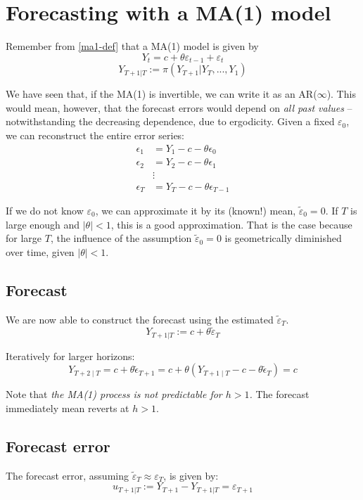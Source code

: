 \documentclass[11pt, a4paper]{report}
\theoremstyle{plain}
\theoremstyle{plain}
\theoremstyle{remark}
\begin{document}
\section{Forecasting with a MA(1) model}

Remember from \ref{ma1-def} that a MA(1) model is given by
$$ Y_t = c + \theta \varepsilon_{t-1} + \varepsilon_{t} $$
$$ Y_{T+1|T} := \pi(Y_{T+1} | Y_T,..., Y_1) $$

We have seen that, if the MA(1) is invertible, we can write it as an AR($\infty$). This would mean, however, that the forecast errors would depend on \textit{all past values} -- notwithstanding the decreasing dependence, due to ergodicity. Given a fixed $\varepsilon_{0}$, we can reconstruct the entire error series: 
$$\begin{aligned}
	\epsilon_{1} &=Y_{1}-c-\theta \epsilon_{0} \\
	\epsilon_{2} &=Y_{2}-c-\theta \epsilon_{1} \\
	& \vdots \\
	\epsilon_{T} &=Y_{T}-c-\theta \epsilon_{T-1}
\end{aligned}$$

If we do not know $\varepsilon_{0}$, we can approximate it by its (known!) mean, $\tilde{\varepsilon}_0 = 0$. If $T$ is large enough and $|\theta| < 1$, this is a good approximation. That is the case because for large $T$, the influence of the assumption $\tilde{\varepsilon}_0 = 0$ is geometrically diminished over time, given $|\theta| < 1$. 


\subsection{Forecast}

We are now able to construct the forecast using the estimated $\tilde{\varepsilon}_T$.
$$ Y_{T+1|T} := c + \theta \tilde{\varepsilon}_T $$

Iteratively for larger horizons:
$$Y_{T+2 \mid T}=c+\theta \widetilde{\epsilon}_{T+1}=c+\theta\left(Y_{T+1 \mid T}-c-\theta \widetilde{\epsilon}_{T}\right)=c$$

Note that \textit{the MA(1) process is not predictable for $h > 1$.} The forecast immediately mean reverts at $h>1$.

\subsection{Forecast error}

The forecast error, assuming $\tilde{\varepsilon}_T \approx \varepsilon_{T}$, is given by: 
$$ u_{T+1|T} := Y_{T+1} - Y_{T+1|T} = \varepsilon_{T+1}$$
\end{document}
